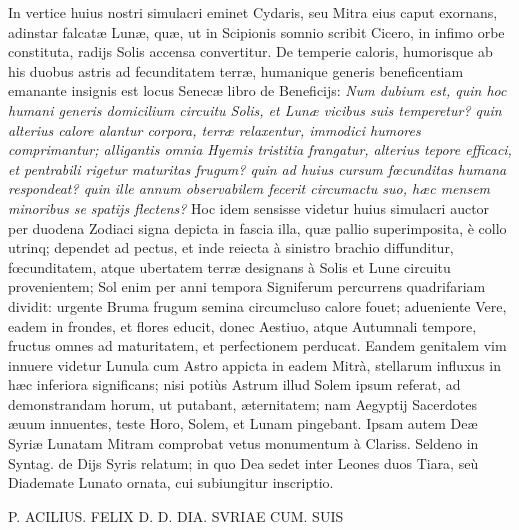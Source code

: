 \documentclass[a4paper, 11pt, oneside, polutonikogreek, latin]{article}
\begin{document}
In vertice huius nostri simulacri eminet Cydaris, seu Mitra eius caput exornans, adinstar falcatæ Lunæ, quæ, ut in Scipionis somnio scribit Cicero, in infimo orbe constituta, radijs Solis accensa convertitur. De temperie caloris, humorisque ab his duobus astris ad fecunditatem terræ, humanique generis beneficentiam emanante insignis est locus Senecæ libro de Beneficijs: \emph{Num dubium est, quin hoc humani generis domicilium circuitu Solis, et Lunæ vicibus suis temperetur? quin alterius calore alantur corpora, terræ relaxentur, immodici humores comprimantur; alligantis omnia Hyemis tristitia frangatur, alterius tepore efficaci, et pentrabili rigetur maturitas frugum? quin ad huius cursum fœcunditas humana respondeat? quin ille annum observabilem fecerit circumactu suo, hæc mensem minoribus se spatijs flectens?} Hoc idem sensisse videtur huius simulacri auctor per duodena Zodiaci signa depicta in fascia illa, quæ pallio superimposita, è collo utrinq; dependet ad pectus, et inde reiecta à sinistro brachio diffunditur, fœcunditatem, atque ubertatem terræ designans à Solis et Lune circuitu provenientem; Sol enim per anni tempora Signiferum percurrens quadrifariam dividit: urgente Bruma frugum semina circumcluso calore fouet; adueniente Vere, eadem in frondes, et flores educit, donec Aestiuo, atque Autumnali tempore, fructus omnes ad maturitatem, et perfectionem perducat. Eandem genitalem vim innuere videtur Lunula cum Astro appicta in eadem Mitrà, stellarum influxus in hæc inferiora significans; nisi potiùs Astrum illud Solem ipsum referat, ad demonstrandam horum, ut putabant, æternitatem; nam Aegyptij Sacerdotes æuum innuentes, teste Horo, Solem, et Lunam pingebant. Ipsam autem Deæ Syriæ Lunatam Mitram comprobat vetus monumentum à Clariss. Seldeno in Syntag. de Dijs Syris relatum; in quo Dea sedet inter Leones duos Tiara, seù Diademate Lunato ornata, cui subiungitur inscriptio.

P. ACILIUS. FELIX
D. D. DIA. SVRIAE
CUM. SUIS
\end{document}
